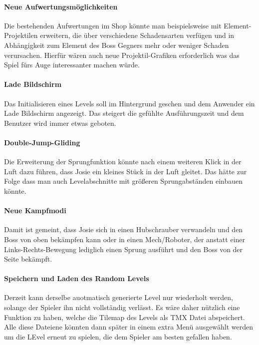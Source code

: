 \paragraph{Neue Aufwertungsmöglichkeiten}
Die bestehenden Aufwertungen im Shop könnte man beispielsweise mit Element-Projektilen erweitern, die über verschiedene Schadensarten verfügen und in Abhängigkeit zum Element des Boss Gegners mehr oder weniger Schaden verursachen. Hierfür wären auch neue Projektil-Grafiken erforderlich was das Spiel fürs Auge interessanter machen würde.

\paragraph{Lade Bildschirm}
Das Initialisieren eines Levels soll im Hintergrund geschen und dem Anwender ein Lade Bildschirm angezeigt. Das steigert die gefühlte Ausführungszeit und dem Benutzer wird immer etwas geboten.

\paragraph{Double-Jump-Gliding}
Die Erweiterung der Sprungfunktion könnte nach einem weiteren Klick in der Luft dazu führen, dass Josie ein kleines Stück in der Luft gleitet. Das hätte zur Folge dass man auch Levelabschnitte mit größeren Sprungabständen einbauen könnte.

\paragraph{Neue Kampfmodi}
Damit ist gemeint, dass Josie sich in einen Hubschrauber verwandeln und den Boss von oben bekämpfen kann oder in einen Mech/Roboter, der anstatt einer Links-Rechts-Bewegung lediglich einen Sprung ausführt und den Boss von der Seite bekämpft.

\paragraph{Speichern und Laden des Random Levels}
Derzeit kann derselbe auotmatisch generierte Level  nur wiederholt werden, solange der Spieler ihn nicht vollständig verlässt. Es wäre daher nützlich eine Funktion zu haben, welche die Tilemap des Levels als TMX Datei abspeichert. Alle diese Dateiene könnten dann später in einem extra Menü ausgewählt werden um die LEvel erneut zu spielen, die dem Spieler am besten gefallen haben. 

